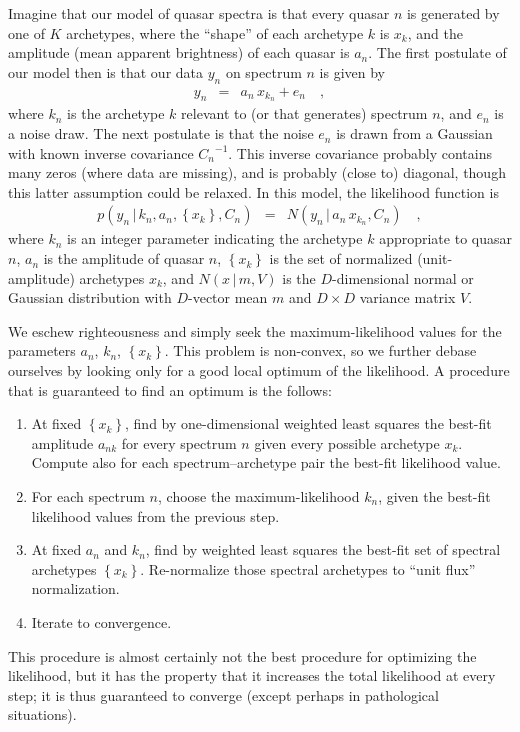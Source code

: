 \documentclass[12pt,letterpaper]{article}
\newcommand{\inverse}[1]{{#1}^{-1}}
\newcommand{\given}{\,|\,}
\newcommand{\setof}[1]{\left\{{#1}\right\}}
\newcommand{\normal}{N}
\begin{document}
Imagine that our model of quasar spectra is that every quasar $n$ is
generated by one of $K$ archetypes,
where the ``shape'' of each archetype $k$ is $x_k$,
and the amplitude (mean apparent brightness) of each quasar is $a_n$.
The first postulate of our model then is that our data $y_n$ on spectrum $n$ is given by
\begin{eqnarray}
y_n
  &=& a_n\,x_{k_n} + e_n
\quad ,
\end{eqnarray}
where $k_n$ is the archetype $k$ relevant to (or that generates) spectrum $n$,
and $e_n$ is a noise draw.
The next postulate is that the noise $e_n$ is drawn from a Gaussian
with known inverse covariance $\inverse{C_n}$.
This inverse covariance
probably contains many zeros (where data are missing),
and is probably (close to) diagonal,
though this latter assumption could be relaxed.
In this model, the likelihood function is
\begin{eqnarray}
p(y_n\given k_n, a_n, \setof{x_k}, C_n)
  &=& \normal(y_n\given a_n\,x_{k_n}, C_n)
\quad,
\end{eqnarray}
where $k_n$ is an integer parameter indicating the archetype $k$ appropriate to quasar $n$,
$a_n$ is the amplitude of quasar $n$,
$\setof{x_k}$ is the set of normalized (unit-amplitude) archetypes $x_k$,
and $\normal(x\given m,V)$ is the $D$-dimensional normal or Gaussian distribution
with $D$-vector mean $m$ and $D\times D$ variance matrix $V$.

We eschew righteousness and simply seek the maximum-likelihood values for the parameters
$a_n$, $k_n$, $\setof{x_k}$.
This problem is non-convex, so we further debase ourselves by looking only for a good
local optimum of the likelihood.
A procedure that is guaranteed to find an optimum is the follows:
\begin{enumerate}
\item At fixed $\setof{x_k}$, find by one-dimensional weighted least squares
the best-fit amplitude $a_{nk}$
for every spectrum $n$ given every possible archetype $x_k$.
Compute also for each spectrum--archetype pair the best-fit likelihood value.
\item For each spectrum $n$, choose the maximum-likelihood $k_n$,
given the best-fit likelihood values from the previous step.
\item At fixed $a_n$ and $k_n$, find by weighted least squares
the best-fit set of spectral archetypes $\setof{x_k}$.
Re-normalize those spectral archetypes to ``unit flux'' normalization.
\item Iterate to convergence.
\end{enumerate}
This procedure is almost certainly not the best procedure for optimizing the likelihood,
but it has the property that it increases the total likelihood at every step;
it is thus guaranteed to converge (except perhaps in pathological situations).
\end{document}
